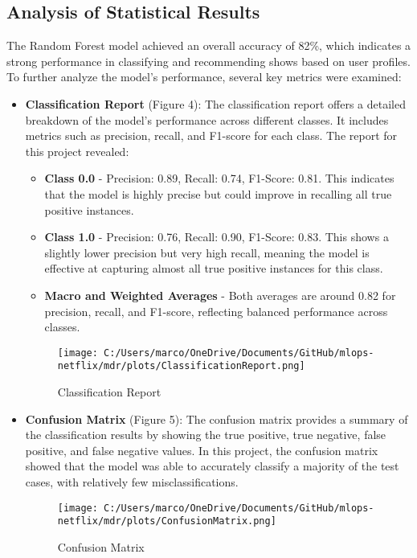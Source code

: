 \documentclass[sigconf]{acmart}
\begin{document}
	\subsection{Analysis of Statistical Results}
	The Random Forest model achieved an overall accuracy of 82\%, which indicates a strong performance in classifying and recommending shows based on user profiles. To further analyze the model's performance, several key metrics were examined:
	\begin{itemize}
		\item \textbf{Classification Report} (Figure 4): The classification report offers a detailed breakdown of the model’s performance across different classes. It includes metrics such as precision, recall, and F1-score for each class. The report for this project revealed:
			\begin{itemize}
				\item \textbf{Class 0.0} - Precision: 0.89, Recall: 0.74, F1-Score: 0.81. This indicates that the model is highly precise but could improve in recalling all true positive instances.
				\item \textbf{Class 1.0} - Precision: 0.76, Recall: 0.90, F1-Score: 0.83. This shows a slightly lower precision but very high recall, meaning the model is effective at capturing almost all true positive instances for this class.
				\item \textbf{Macro and Weighted Averages} - Both averages are around 0.82 for precision, recall, and F1-score, reflecting balanced performance across classes.
			\end{itemize}
			\begin{figure}[H]
				\centering
				\texttt{[image: C:/Users/marco/OneDrive/Documents/GitHub/mlops-netflix/mdr/plots/ClassificationReport.png]}
				\caption{Classification Report}
				\label{fig:Classification_Report}
			\end{figure}
			\FloatBarrier
		\item \textbf{Confusion Matrix} (Figure 5): The confusion matrix provides a summary of the classification results by showing the true positive, true negative, false positive, and false negative values. In this project, the confusion matrix showed that the model was able to accurately classify a majority of the test cases, with relatively few misclassifications.
		\begin{figure}[H]
			\centering
			\texttt{[image: C:/Users/marco/OneDrive/Documents/GitHub/mlops-netflix/mdr/plots/ConfusionMatrix.png]}
			\caption{Confusion Matrix}

\end{figure}
\end{itemize}
\end{document}

